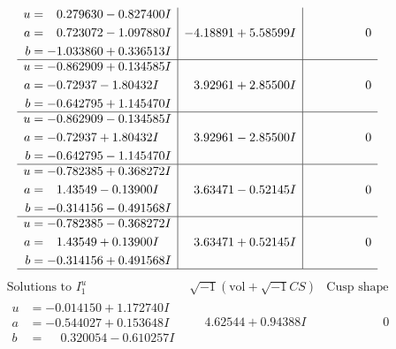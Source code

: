 \documentclass[1p]{elsarticle_modified}
\theoremstyle{definition}
\newcommand{\I}{\sqrt{-1}}
\begin{document}
$$\begin{array}{c|c|c}
\begin{aligned}
u &= \phantom{-}0.279630 - 0.827400 I \\
a &= \phantom{-}0.723072 - 1.097880 I \\
b &= -1.033860 + 0.336513 I\end{aligned}
 & -4.18891 + 5.58599 I & \phantom{-0.000000 } 0 \\ \hline\begin{aligned}
u &= -0.862909 + 0.134585 I \\
a &= -0.72937 - 1.80432 I \\
b &= -0.642795 + 1.145470 I\end{aligned}
 & \phantom{-}3.92961 + 2.85500 I & \phantom{-0.000000 } 0 \\ \hline\begin{aligned}
u &= -0.862909 - 0.134585 I \\
a &= -0.72937 + 1.80432 I \\
b &= -0.642795 - 1.145470 I\end{aligned}
 & \phantom{-}3.92961 - 2.85500 I & \phantom{-0.000000 } 0 \\ \hline\begin{aligned}
u &= -0.782385 + 0.368272 I \\
a &= \phantom{-}1.43549 - 0.13900 I \\
b &= -0.314156 - 0.491568 I\end{aligned}
 & \phantom{-}3.63471 - 0.52145 I & \phantom{-0.000000 } 0 \\ \hline\begin{aligned}
u &= -0.782385 - 0.368272 I \\
a &= \phantom{-}1.43549 + 0.13900 I \\
b &= -0.314156 + 0.491568 I\end{aligned}
 & \phantom{-}3.63471 + 0.52145 I & \phantom{-0.000000 } 0\\
 \hline 
 \end{array}$$\newpage$$\begin{array}{c|c|c}  
\text{Solutions to }I^u_{1}& \I (\text{vol} + \sqrt{-1}CS) & \text{Cusp shape}\\
 \hline 
\begin{aligned}
u &= -0.014150 + 1.172740 I \\
a &= -0.544027 + 0.153648 I \\
b &= \phantom{-}0.320054 - 0.610257 I\end{aligned}
 & \phantom{-}4.62544 + 0.94388 I & \phantom{-0.000000 } 0 \\ \hline\begin{aligned}

\end{aligned}
\end{array}$$
\end{document}
